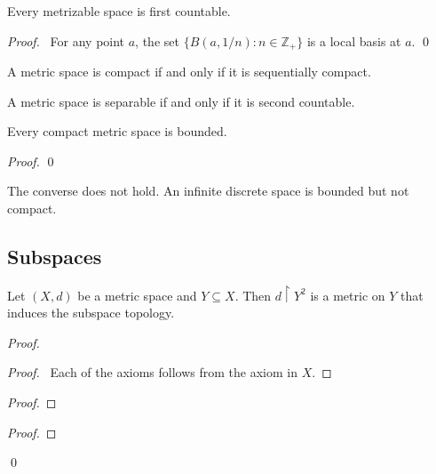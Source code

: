 \begin{prop}
Every metrizable space is first countable.
\end{prop}

\begin{proof}
\pf\ For any point $a$, the set $\{ B(a,1/n) : n \in \mathbb{Z}_+ \}$ is a local basis at $a$. \qed
\end{proof}

A metric space is compact if and only if it is sequentially compact.

A metric space is separable if and only if it is second countable.

\begin{prop}
Every compact metric space is bounded.
\end{prop}

\begin{proof}
\pf
{}
\qed
\end{proof}

\begin{ex}
The converse does not hold. An infinite discrete space is bounded but not compact.
\end{ex}

\subsection{Subspaces}

\begin{prop}
Let $(X,d)$ be a metric space and $Y \subseteq X$. Then $d \restriction Y^2$ is a metric on $Y$ that induces the subspace topology.
\end{prop}

\begin{proof}
\pf
{}
\begin{proof}
	\pf\ Each of the axioms follows from the axiom in $X$.
\end{proof}
\begin{proof}
\end{proof}
\begin{proof}
\end{proof}
\qed
\end{proof}

